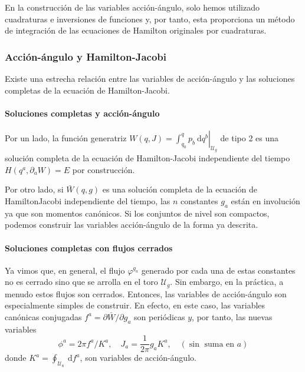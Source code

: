 En la construcción de las variables acción-ángulo, solo hemos utilizado cuadraturas e inversiones de funciones y, por tanto, esta proporciona un método de integración de las ecuaciones de Hamilton originales por cuadraturas.
\subsubsection{Acción-ángulo y Hamilton-Jacobi}
Existe una estrecha relación entre las variables de acción-ángulo y las soluciones completas de la ecuación de Hamilton-Jacobi.
\paragraph{Soluciones completas y acción-ángulo}
Por un lado, la función generatriz $W(q, J)=\left.\int_{q_{0}}^{q} p_{b} \mathrm{~d} q^{b}\right|_{\mathscr{U}_{g}}$ de tipo 2 es una solución completa de la ecuación de Hamilton-Jacobi independiente del tiempo $H\left(q^{a}, \partial_{a} W\right)=E$ por construcción.

Por otro lado, si $\bar{W}(q, g)$ es una solución completa de la ecuación de HamiltonJacobi independiente del tiempo, las $n$ constantes $g_{a}$ están en involución ya que son momentos canónicos. Si los conjuntos de nivel son compactos, podemos construir las variables acción-ángulo de la forma ya descrita.
\paragraph{Soluciones completas con flujos cerrados}
Ya vimos que, en general, el flujo $\varphi^{g_{a}}$ generado por cada una de estas constantes no es cerrado sino que se arrolla en el toro $\mathscr{U}_{g}$. Sin embargo, en la práctica, a menudo estos flujos son cerrados. Entonces, las variables de acción-ángulo son especialmente simples de construir. En efecto, en este caso, las variables canónicas conjugadas $f^{a}=\partial \bar{W} / \partial g_{a}$ son periódicas $y$, por tanto, las nuevas variables
$$
\phi^{a}=2 \pi f^{a} / K^{a}, \quad J_{a}=\frac{1}{2 \pi} g_{a} K^{a}, \quad(\sin \text { suma en } a)
$$
donde $K^{a}=\oint_{\mathscr{U}_{8}} \mathrm{~d} f^{a}$, son variables de acción-ángulo.
